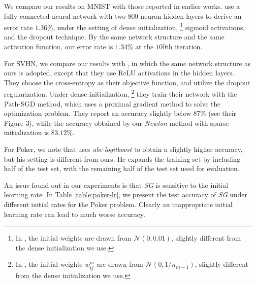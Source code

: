 \documentclass[12pt]{article}
\begin{document}
\par We compare our results on {\sf MNIST} with those reported in earlier works. \cite{LW13a} use a
fully connected neural network with two 800-neuron hidden layers to derive an error rate $1.36\%$,
under the setting of dense initialization,%
\footnote{In \cite{LW13a}, the initial weights are drawn from $\mathcal{N}(0,0.01)$, slightly different from the dense initialization we use.} %
sigmoid activations, and the dropout technique. By the same network structure and the same activation function, our error rate is $1.34\%$ at the $100$th iteration.

\par For {\sf SVHN}, we compare our results with \cite{BN15b}, in which the same network structure as ours is adopted, except that they use ReLU activations in the hidden layers. They choose the cross-entropy as their objective function, and utilize the dropout regularization. Under dense initialization,%
\footnote{In \cite{BN15b}, the initial weights $w^m_{t j}$ are drawn from $\mathcal{N}(0, 1 / n_{m-1})$, slightly different from the dense initialization we use.} %
they train their network with the Path-SGD method, which uses a proximal gradient method to solve the optimization problem. They report an accuracy slightly below $87\%$ (see their Figure 3), while the accuracy obtained by our {\sl Newton} method with sparse initialization is $83.12\%$.


\par For {\sf Poker}, we note that \cite{PL10c} uses {\sl abc-logitboost} to obtain a slightly higher accuracy, but his setting is different from ours. He expands the training set by including half of the test set, with the remaining half of the test set used for evaluation.

\par An issue found out in our experiments is that {\sl SG} is sensitive to the initial learning rate. 
In Table \ref{table:poker-lr}, we present the test accuracy of {\sl SG} under different initial rates for the {\sf Poker} problem.
Clearly an inappropriate initial learning rate can lead to much worse accuracy.
\end{document}
